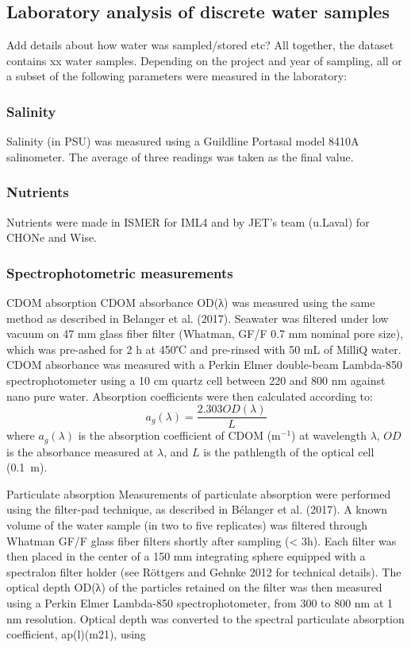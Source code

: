 \documentclass[essd, manuscript]{copernicus}
\begin{document}
\subsection{Laboratory analysis of discrete water samples} \label{labo}
Add details about how water was sampled/stored etc?
All together, the dataset contains xx water samples. Depending on the project and year of sampling, all or a subset of the following parameters were measured in the laboratory:

\subsubsection{Salinity}
Salinity (in PSU) was measured using a Guildline Portasal model 8410A salinometer. The average of three readings was taken as the final value.

\subsubsection{Nutrients}
Nutrients were made in ISMER for IML4 and by JET’s team (u.Laval) for CHONe and Wise.

\subsubsection{Spectrophotometric measurements}
CDOM absorption
CDOM absorbance OD(λ) was measured using the same method as described in Belanger et al. (2017). Seawater was filtered under low vacuum on 47 mm glass fiber filter (Whatman, GF/F 0.7 mm nominal pore size), which was pre-ashed for 2 h at 450℃ and pre-rinsed with 50 mL of MilliQ water. CDOM absorbance was measured with a Perkin Elmer double-beam Lambda-850 spectrophotometer using a 10 cm quartz cell between 220 and 800 nm against nano pure water. Absorption coefficients were then calculated according to:
\begin{equation}
a_g(\lambda) = \frac{2.303 OD(\lambda)}{L}
\label{eq:ag}
\end{equation}
where $a_g(\lambda)$ is the absorption coefficient of CDOM (m$^{-1}$) at wavelength $\lambda$, $OD$ is the absorbance measured at $\lambda$, and $L$ is the pathlength of the optical cell (0.1~m).

Particulate absorption
Measurements of particulate absorption were performed using the filter-pad technique, as described in Bélanger et al. (2017). A known volume of the water sample (in two to five replicates) was filtered through Whatman GF/F glass fiber filters shortly after sampling (< 3h). Each filter was then placed in the center of a 150 mm integrating sphere equipped with a spectralon filter holder (see Röttgers and Gehnke 2012 for technical details). The optical depth OD(λ) of the particles retained on the filter was then measured using a Perkin Elmer Lambda-850 spectrophotometer, from 300 to 800 nm at 1 nm resolution. Optical depth was converted to the spectral particulate absorption coefficient, ap(l)(m21), using
\end{document}
